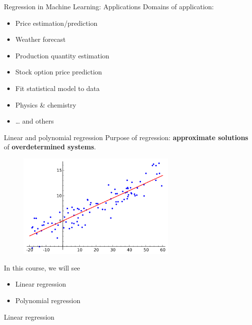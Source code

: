 \documentclass{beamer}
\begin{document}
\begin{frame}{Regression in Machine Learning: Applications}
Domains of application:
\begin{itemize}
	\item Price estimation/prediction
	\item Weather forecast
	\item Production quantity estimation
	\item Stock option price prediction
	\item Fit statistical model to data
	\item Physics \& chemistry
	\item \ldots{} and others
\end{itemize}
\end{frame}
%
\begin{frame}{Linear and polynomial regression}
Purpose of regression: \textbf{approximate solutions} of \textbf{overdetermined systems}.
\vfill
\begin{figure}
\centering
\includegraphics[width=0.70\textwidth]{images/2d_regression.png}
\end{figure}
\vfill
In this course, we will see
\begin{itemize}
	\item Linear regression
	\item Polynomial regression
\end{itemize}
\end{frame}
%
\begin{frame}
\begin{center}
\Huge{Linear regression}
\end{center}
\end{frame}
%
\end{document}
